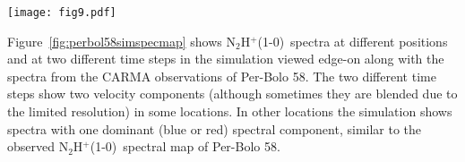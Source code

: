 \documentclass[iop]{emulateapj}
\newcommand{\kms}{\,~km~s$^{-1}$}
\newcommand{\nthp}{\mbox{\rm N$_2$H$^+$(1-0)}}
\begin{document}
\begin{figure*}
\texttt{[image: fig9.pdf]}
\caption{Simulations and Per-Bolo 58 integrated intensity maps for the blue and red peak in the spectra of \nthp. The simulation corresponds to synthetic observations made with the same uv-sampling as the observed source. The view of the simulations is edge-on. The magnetic field and the net angular momentum vectors in the simulations are along the horizontal direction. The gray maps show the total (blue plus red) integrated intensity in each map. The colorbar is in units of Jy beam$^{-1}$\kms\ and it is presented in a logarithmic scale. The blue(red) contours show the blue(red) component integrated intensity. Left: simulation at 0.133 Myr.  Middle: simulation at 0.152 Myr. Right: observations. Black ellipse corresponds to the beam. Contours are drawn at 20, 30, 50, 70 and 90$\%$ of the maximum for the observations and simulations.
\label{fig:perbol58simmom0}}
\end{figure*}


Figure~\ref{fig:perbol58simspecmap} shows \nthp\ spectra at different positions and at two different time steps in the simulation viewed edge-on along with the spectra from the CARMA observations of Per-Bolo 58. The two different time steps show two velocity components (although sometimes they are blended due to the limited resolution) in some locations. In other locations the simulation shows spectra with one dominant (blue or red) spectral component, similar to the observed \nthp\ spectral map of Per-Bolo 58.\\
\end{document}
